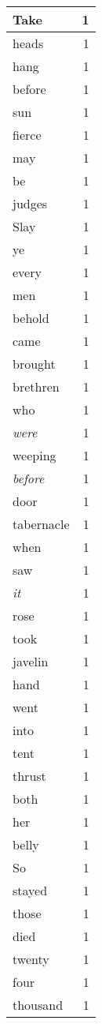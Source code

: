 \begin{center}
\begin{longtable}{l|r}
Take & 1\\ \hline 
heads & 1\\ \hline 
hang & 1\\ \hline 
before & 1\\ \hline 
sun & 1\\ \hline 
fierce & 1\\ \hline 
may & 1\\ \hline 
be & 1\\ \hline 
judges & 1\\ \hline 
Slay & 1\\ \hline 
ye & 1\\ \hline 
every & 1\\ \hline 
men & 1\\ \hline 
behold & 1\\ \hline 
came & 1\\ \hline 
brought & 1\\ \hline 
brethren & 1\\ \hline 
who & 1\\ \hline 
\emph{were} & 1\\ \hline 
weeping & 1\\ \hline 
\emph{before} & 1\\ \hline 
door & 1\\ \hline 
tabernacle & 1\\ \hline 
when & 1\\ \hline 
saw & 1\\ \hline 
\emph{it} & 1\\ \hline 
rose & 1\\ \hline 
took & 1\\ \hline 
javelin & 1\\ \hline 
hand & 1\\ \hline 
went & 1\\ \hline 
into & 1\\ \hline 
tent & 1\\ \hline 
thrust & 1\\ \hline 
both & 1\\ \hline 
her & 1\\ \hline 
belly & 1\\ \hline 
So & 1\\ \hline 
stayed & 1\\ \hline 
those & 1\\ \hline 
died & 1\\ \hline 
twenty & 1\\ \hline 
four & 1\\ \hline 
thousand & 1\\ \hline 

\end{longtable}
\end{center}
